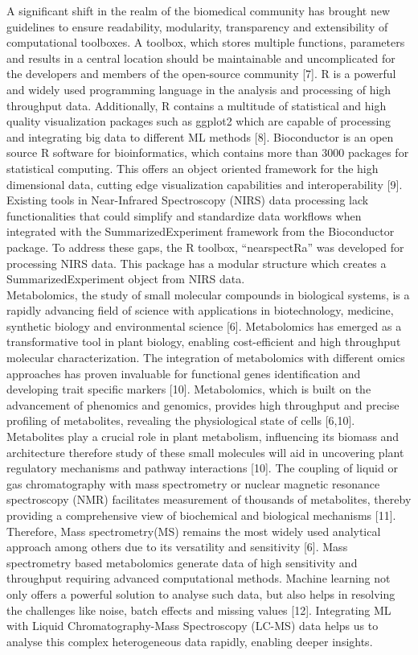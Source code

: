 \documentclass[12pt,a4paper]{report}
\begin{document}
A significant  shift in the realm of the biomedical community has brought new guidelines to ensure readability, modularity, transparency and extensibility of computational toolboxes. A toolbox, which stores multiple functions, parameters and results in a central location should be maintainable and uncomplicated for the developers and members of the open-source community [7].
R is a powerful and widely used programming language in the analysis and processing of high throughput data. Additionally, R contains a multitude of statistical and high quality visualization packages such as ggplot2 which are capable of processing and integrating big data to different ML methods [8]. Bioconductor is an open source R software for bioinformatics, which contains more than 3000 packages for statistical computing. 
This offers an object oriented framework for the high dimensional data, cutting edge visualization capabilities and interoperability [9]. Existing tools in Near-Infrared Spectroscopy (NIRS) data processing lack functionalities that could simplify and standardize data workflows when integrated with the SummarizedExperiment framework from the Bioconductor package. To address these gaps, the R toolbox, “nearspectRa” was developed for processing NIRS data.
This package has a modular structure which creates a SummarizedExperiment object from NIRS data. \\


Metabolomics, the study of small molecular compounds in biological systems, is a rapidly advancing field of science with applications in biotechnology, medicine, synthetic biology and environmental science [6]. Metabolomics has emerged as a transformative tool in plant biology, enabling cost-efficient and high throughput molecular characterization.
The integration of metabolomics with different omics approaches has proven invaluable for functional genes identification and developing trait specific markers [10]. Metabolomics, which is built on the advancement of phenomics and genomics, provides high throughput and precise profiling of metabolites, revealing the physiological state of cells [6,10].
Metabolites play a crucial role in plant metabolism, influencing its biomass and architecture therefore study of these small molecules will aid in uncovering plant regulatory mechanisms and pathway interactions [10].
The coupling of liquid or gas chromatography with mass spectrometry or nuclear magnetic resonance spectroscopy (NMR) facilitates measurement of thousands of metabolites, thereby providing a comprehensive view of biochemical and biological mechanisms [11]. Therefore, Mass spectrometry(MS) remains the most widely used analytical approach among others due to its versatility and sensitivity [6].
Mass spectrometry based metabolomics generate data of high sensitivity and throughput requiring advanced computational methods. Machine learning not only offers a powerful solution to analyse such data, but also helps in resolving the challenges like noise, batch effects and missing values [12]. Integrating ML with Liquid Chromatography-Mass Spectroscopy (LC-MS) data helps us to analyse this complex heterogeneous data rapidly, enabling deeper insights. \\
\end{document}
